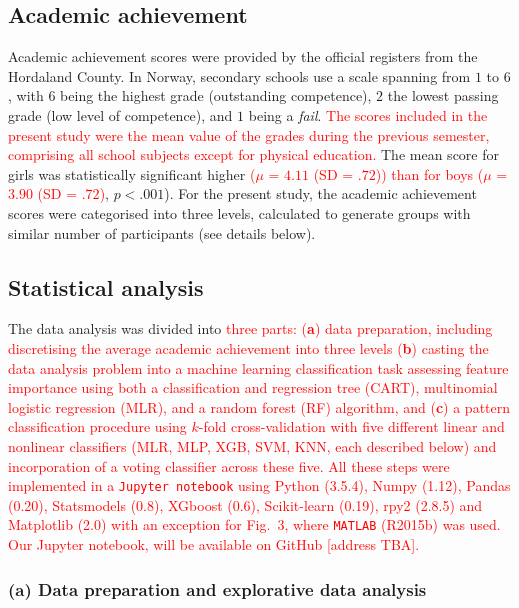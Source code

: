 \documentclass[10pt,letterpaper]{article}
\begin{document}
\subsection*{Academic achievement}
Academic achievement scores were provided by the official registers from the Hordaland County. In Norway, secondary schools use a scale spanning from $1$ to $6$, with $6$ 
being the highest grade (outstanding competence),  $2$  the lowest passing grade (low level of competence), and $1$ being a {\it fail}. 
\textcolor{red}{The scores included in the present study were the mean value of the grades during the previous semester, comprising all school subjects except for physical education. }
The mean score for girls was statistically significant higher  \textcolor{red}{($\mu$ = $4.11$ (SD = $.72$)) than for boys {($\mu$ = $3.90$ (SD = $.72$)}}, $p  <  .001$). 
For the present study, the academic achievement scores were categorised into three levels, calculated to generate groups with similar number of participants (see details below). 



\subsection*{Statistical analysis}
The data analysis was divided into \textcolor{red}{three parts: ({\bf  a}) data preparation, including discretising the average academic achievement into three levels  ({\bf b}) casting the data analysis problem 
into a machine learning classification task assessing feature importance using both 
a classification and regression tree (CART), multinomial logistic regression (MLR), and a random forest (RF) algorithm, and ({\bf c}) a pattern 
classification procedure using $k$-fold cross-validation with five different linear and nonlinear classifiers (MLR, MLP, XGB, SVM, KNN, each described below) and incorporation of
a voting classifier across  these five.
All these steps were implemented in a {\tt Jupyter notebook}  using Python (3.5.4), Numpy (1.12), Pandas (0.20), Statsmodels (0.8),  XGboost (0.6), Scikit-learn (0.19),  rpy2 (2.8.5)
and Matplotlib (2.0) with an exception for Fig.~3,
where {\tt MATLAB} (R2015b) was used. Our Jupyter notebook, will be available on GitHub [address TBA].}  

\vspace{3mm}
\subsubsection*{(a) Data preparation and explorative data analysis}
\end{document}

